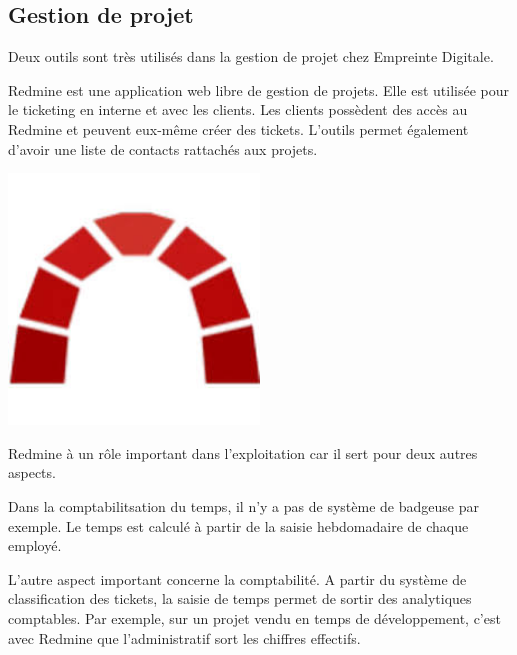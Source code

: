 \documentclass[12pt]{article}
\begin{document}
\subsection{Gestion de projet}
Deux outils sont très utilisés dans la gestion de projet chez Empreinte Digitale. \\

\noindent%
\begin{minipage}{.7\textwidth}%
Redmine est une application web libre de gestion de projets.
Elle est utilisée pour le ticketing en interne et avec les clients.
Les clients possèdent des accès au Redmine et peuvent eux-même créer des tickets.
L'outils permet également d'avoir une liste de contacts rattachés aux projets. \\
\end{minipage}%
\hfill
\begin{minipage}{.3\textwidth}%
\begin{center}
\includegraphics[width=0.5\textwidth]{src/logo_redmine.jpeg}
\end{center}
\end{minipage}%

Redmine à un rôle important dans l'exploitation car il sert pour deux autres aspects.

Dans la comptabilitsation du temps, il n'y a pas de système de badgeuse par exemple.
Le temps est calculé à partir de la saisie hebdomadaire de chaque employé.

L'autre aspect important concerne la comptabilité.
A partir du système de classification des tickets, la saisie de temps permet de sortir des analytiques comptables.
Par exemple, sur un projet vendu en temps de développement, c'est avec Redmine que l'administratif sort les chiffres effectifs. \\
\end{document}
